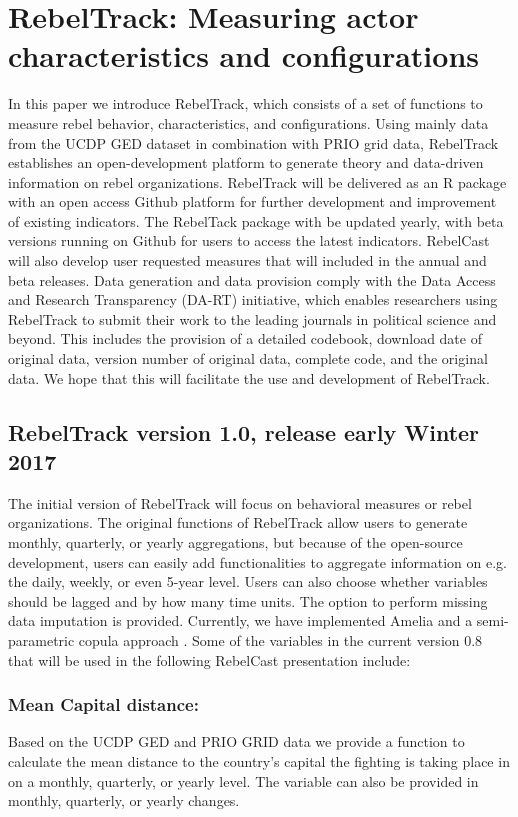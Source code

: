 \documentclass[11pt,oneside,fullpage]{amsart}
\begin{document}
\section{RebelTrack: Measuring actor characteristics and configurations}
In this paper we introduce RebelTrack, which consists of a set of functions to measure rebel behavior, characteristics, and configurations. Using mainly data from the UCDP GED dataset in combination with PRIO grid data, RebelTrack establishes an open-development platform to generate theory and data-driven information on rebel organizations. RebelTrack will be delivered as an R package with an open access Github platform for further development and improvement of existing indicators. The RebelTack package with be updated yearly, with beta versions running on Github for users to access the latest indicators. RebelCast will also develop user requested measures that will included in the annual and beta releases. Data generation and data provision comply with the Data Access and Research Transparency (DA-RT) initiative, which enables researchers using RebelTrack to submit their work to the leading journals in political science and beyond. This includes the provision of a detailed codebook, download date of original data, version number of original data, complete code, and the original data. We hope that this will facilitate the use and development of RebelTrack. 



\subsection{RebelTrack version 1.0, release early Winter 2017}
The initial version of RebelTrack will focus on behavioral measures or rebel organizations. The original functions of RebelTrack allow users to generate monthly, quarterly, or yearly aggregations, but because of the open-source development, users can easily add functionalities to aggregate information on e.g. the daily, weekly, or even 5-year level. Users can also choose whether variables should be lagged and by how many time units. The option to perform missing data imputation is provided. Currently, we have implemented Amelia \citep{king:etal:2001} and a semi-parametric copula approach \citep{hoff:2007}. Some of the variables in the current version 0.8 that will be used in the following RebelCast presentation include:

\subsubsection{\textbf{Mean Capital distance:}} Based on the UCDP GED and PRIO GRID data we provide a function to calculate the mean distance to the country's capital the fighting is taking place in on a monthly, quarterly, or yearly level. The variable can also be provided in monthly, quarterly, or yearly changes.
\end{document}
